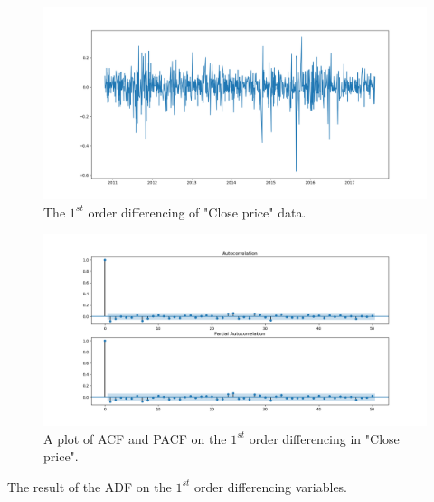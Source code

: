 \begin{figure}[H]
    \centering
    \begin{minipage}[b]{1\textwidth}
        \includegraphics[width=\textwidth]{figures/Ass2/Ass2_Q4_1diff_Close_signal.png}
    \end{minipage}
    \caption{The $1^{st}$ order differencing of "Close price" data.}
    \label{fig:Ass2_Q4_1diff_Close_signal}
\end{figure}

\begin{figure}[H]
    \centering
    \begin{minipage}[b]{1\textwidth}
        \includegraphics[width=\textwidth]{figures/Ass2/Ass2_Q3_PACF_ACF_1diff.png}
    \end{minipage}
    \caption{A plot of \gls{ACF} and \gls{PACF} on the $1^{st}$ order differencing in "Close price".}
    \label{fig:Ass2_Q4_PACF_ACF_1diff}
\end{figure}

\begin{table}[H]
\centering
\caption{The result of the \gls{ADF} on the $1^{st}$ order differencing variables.}
\label{tab:Ass2_Q4_ADF_results2}

\end{table}


